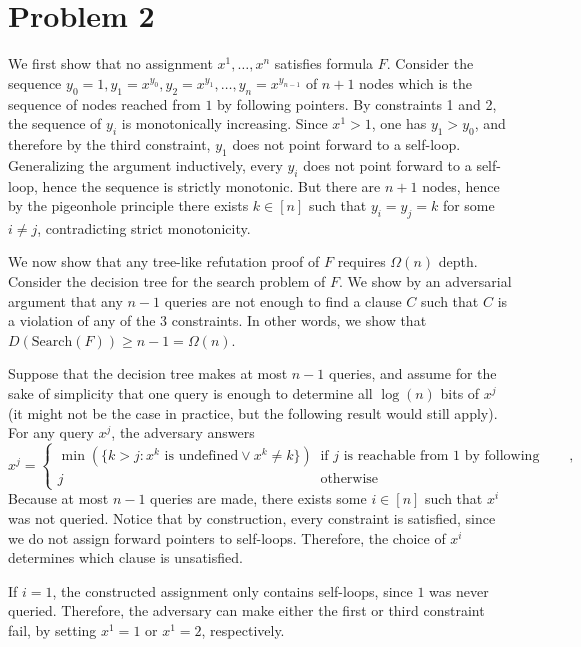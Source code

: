 \documentclass{article}
\begin{document}
\section*{Problem 2}

We first show that no assignment $x^{1}, \ldots, x^{n}$
satisfies formula $F$. Consider the sequence $y_0 = 1, y_1 = x^{y_0}, y_2
= x^{y_1}, \ldots, y_{n} = x^{y_{n-1}}$ of $n+1$ nodes which is the sequence of
nodes reached from $1$ by following pointers. By constraints 1 and 2, the
sequence of $y_i$ is monotonically increasing. Since $x^1 > 1$, one has $y_1
> y_0$, and therefore by the third constraint, $y_1$ does not point forward to
a self-loop. Generalizing the argument inductively, every $y_i$ does not point
forward to a self-loop, hence the sequence is strictly monotonic. But there are
$n+1$ nodes, hence by the pigeonhole principle there exists $k \in [n]$ such
that $y_i = y_j = k$ for some $i \neq j$, contradicting strict monotonicity.

We now show that any tree-like refutation proof of $F$ requires $\Omega(n)$
depth. Consider the decision tree for the search problem of $F$. We show by an
adversarial argument that any $n - 1$ queries are not enough to find a clause
$C$ such that $C$ is a violation of any of the 3 constraints. In other words, we
show that $D(\textrm{Search}(F)) \geq n - 1 = \Omega(n)$.

Suppose that the decision tree makes at most $n - 1$ queries, and assume for the
sake of simplicity that one query is enough to determine all $\log(n)$ bits of
$x^j$ (it might not be the case in practice, but the following result would
still apply). For any query $x^{j}$, the adversary answers
\[
x^j = \begin{cases}
	\min(\{k > j : x^k \textrm{ is undefined} \lor x^k \neq k\}) & \textrm{if
	} j \textrm{ is reachable from 1 by following pointers}, \\
	j & \textrm{otherwise}
\end{cases}
\]
Because at most $n - 1$ queries are made, there exists some $i \in [n]$ such
that $x^i$ was not queried. Notice that by construction, every constraint is
satisfied, since we do not assign forward pointers to self-loops. Therefore, the
choice of $x^i$ determines which clause is unsatisfied.

If $i = 1$, the constructed assignment only contains self-loops, since $1$ was
never queried. Therefore, the adversary can make either the first or third
constraint fail, by setting $x^1 = 1$ or $x^1 = 2$, respectively.
\end{document}
